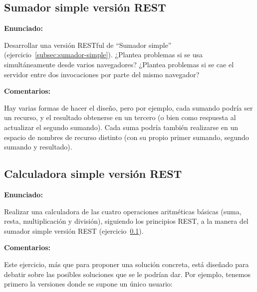 \subsection{Sumador simple versión REST}
\label{subsec:sumador-simple-rest}

\textbf{Enunciado:}

Desarrollar una versión RESTful de ``Sumador simple'' (ejercicio~\ref{subsec:sumador-simple}). ¿Plantea problemas si se usa simultáneamente desde varios navegadores? ¿Plantea problemas si se cae el servidor entre dos invocaciones por parte del mismo navegador?

\textbf{Comentarios:}

Hay varias formas de hacer el diseño, pero por ejemplo, cada sumando podría ser un recurso, y el resultado obtenerse en un tercero (o bien como respuesta al actualizar el segundo sumando). Cada suma podría también realizarse en un espacio de nombres de recurso distinto (con su propio primer sumando, segundo sumando y resultado).


\subsection{Calculadora simple versión REST}
\label{subsec:calc-simple-rest}

\textbf{Enunciado:}

Realizar una calculadora de las cuatro operaciones aritméticas básicas (suma, resta, multiplicación y división), siguiendo los principios REST, a la manera del sumador simple versión REST (ejercicio~\ref{subsec:sumador-simple-rest}).

\textbf{Comentarios:}

Este ejercicio, más que para proponer una solución concreta, está diseñado para debatir sobre las posibles soluciones que se le podrían dar. Por ejemplo, tenemos primero la versiones donde se supone un único usuario:

